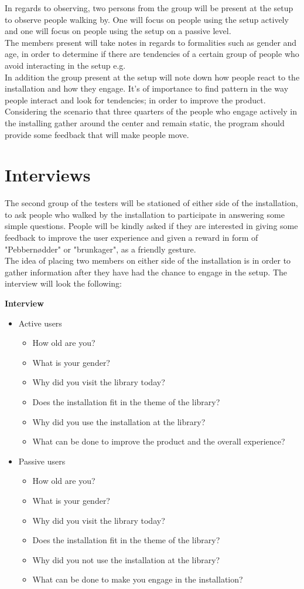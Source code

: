 In regards to observing, two persons from the group will be present at the setup to observe people walking by. One will focus on people using the setup actively and one will focus on people using the setup on a passive level.\\
The members present will take notes in regards to formalities such as gender and age, in order to determine if there are tendencies of a certain group of people who avoid interacting in the setup e.g.\\
In addition the group present at the setup will note down how people react to the installation and how they engage. It's of importance to find pattern in the way people interact and look for tendencies; in order to improve the product. Considering the scenario that three quarters of the people who engage actively in the installing gather around the center and remain static, the program should provide some feedback that will make people move.

\section{Interviews}
The second group of the testers will be stationed of either side of the installation, to ask people who walked by the installation to participate in answering some simple questions. People will be kindly asked if they are interested in giving some feedback to improve the user experience and given a reward in form of "Pebbern{\o}dder" or "brunkager", as a friendly gesture.\\
The idea of placing two members on either side of the installation is in order to gather information after they have had the chance to engage in the setup. The interview will look the following:

\textbf{Interview}
\begin{itemize}
\item Active users
\begin{itemize}
\item How old are you?
\item What is your gender?
\item Why did you visit the library today?
\item Does the installation fit in the theme of the library?
\item Why did you use the installation at the library?
\item What can be done to improve the product and the overall experience?
\end{itemize}
\item Passive users
\begin{itemize}
\item How old are you?
\item What is your gender? 
\item Why did you visit the library today?
\item Does the installation fit in the theme of the library?
\item Why did you not use the installation at the library?
\item What can be done to make you engage in the installation?
\end{itemize}
\end{itemize}

